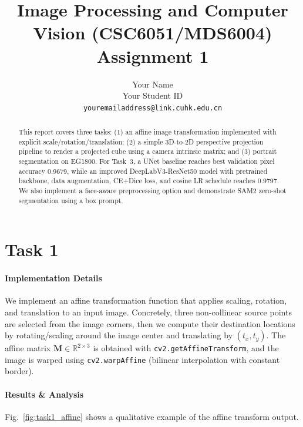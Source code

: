 \documentclass[final]{cvpr}
\begin{document}
\title{Image Processing and Computer Vision (CSC6051/MDS6004)  \\ Assignment 1}

\author{Your Name\\
Your Student ID\\
{\tt\small youremailaddress@link.cuhk.edu.cn}
}

\maketitle


\begin{abstract}
This report covers three tasks: (1) an affine image transformation implemented with explicit scale/rotation/translation; (2) a simple 3D-to-2D perspective projection pipeline to render a projected cube using a camera intrinsic matrix; and (3) portrait segmentation on EG1800. For Task~3, a UNet baseline reaches best validation pixel accuracy 0.9679, while an improved DeepLabV3-ResNet50 model with pretrained backbone, data augmentation, CE+Dice loss, and cosine LR schedule reaches 0.9797. We also implement a face-aware preprocessing option and demonstrate SAM2 zero-shot segmentation using a box prompt.
\end{abstract}

\section{Task 1}

\paragraph{Implementation Details}
We implement an affine transformation function that applies scaling, rotation, and translation to an input image. Concretely, three non-collinear source points are selected from the image corners, then we compute their destination locations by rotating/scaling around the image center and translating by $(t_x,t_y)$. The affine matrix $\mathbf{M}\in\mathbb{R}^{2\times3}$ is obtained with \texttt{cv2.getAffineTransform}, and the image is warped using \texttt{cv2.warpAffine} (bilinear interpolation with constant border).


\paragraph{Results \& Analysis}
Fig.~\ref{fig:task1_affine} shows a qualitative example of the affine transform output.
\end{document}
